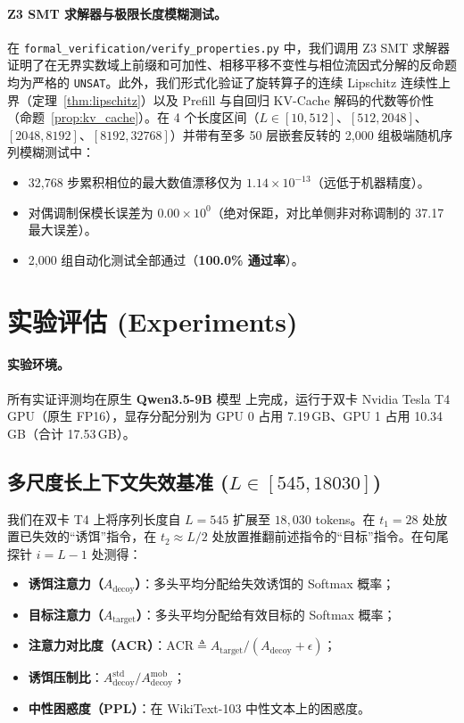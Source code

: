 \documentclass[11pt,a4paper]{article}
\theoremstyle{definition}
\begin{document}
\paragraph{Z3 SMT 求解器与极限长度模糊测试。}
在 \texttt{formal\_verification/verify\_properties.py} 中，我们调用 Z3 SMT 求解器 \cite{de2008z3} 证明了在无界实数域上前缀和可加性、相移平移不变性与相位流因式分解的反命题均为严格的 \texttt{UNSAT}。此外，我们形式化验证了旋转算子的连续 Lipschitz 连续性上界（定理~\ref{thm:lipschitz}）以及 Prefill 与自回归 KV-Cache 解码的代数等价性（命题~\ref{prop:kv_cache}）。在 4 个长度区间（$L \in [10, 512]$、$[512, 2048]$、$ [2048, 8192]$、$[8192, 32768]$）并带有至多 50 层嵌套反转的 2,000 组极端随机序列模糊测试中：
\begin{itemize}
    \item 32,768 步累积相位的最大数值漂移仅为 $1.14 \times 10^{-13}$（远低于机器精度）。
    \item 对偶调制保模长误差为 $0.00 \times 10^0$（绝对保距，对比单侧非对称调制的 37.17 最大误差）。
    \item 2,000 组自动化测试全部通过（\textbf{100.0\% 通过率}）。
\end{itemize}

\section{实验评估 (Experiments)}
\paragraph{实验环境。}
所有实证评测均在原生 \textbf{Qwen3.5-9B} 模型 \cite{qwen35} 上完成，运行于双卡 Nvidia Tesla T4 GPU（原生 FP16），显存分配分别为 GPU 0 占用 7.19\,GB、GPU 1 占用 10.34\,GB（合计 17.53\,GB）。

\subsection{多尺度长上下文失效基准 ($L \in [545, 18030]$)}
我们在双卡 T4 上将序列长度自 $L=545$ 扩展至 $18,030$ tokens。在 $t_1 = 28$ 处放置已失效的“诱饵”指令，在 $t_2 \approx L/2$ 处放置推翻前述指令的“目标”指令。在句尾探针 $i = L-1$ 处测得：
\begin{itemize}
    \item \textbf{诱饵注意力（$A_{\mathrm{decoy}}$）}：多头平均分配给失效诱饵的 Softmax 概率；
    \item \textbf{目标注意力（$A_{\mathrm{target}}$）}：多头平均分配给有效目标的 Softmax 概率；
    \item \textbf{注意力对比度（ACR）}：$\mathrm{ACR} \triangleq A_{\mathrm{target}} / (A_{\mathrm{decoy}} + \epsilon)$；
    \item \textbf{诱饵压制比}：$A_{\mathrm{decoy}}^{\mathrm{std}} / A_{\mathrm{decoy}}^{\mathrm{mob}}$；
    \item \textbf{中性困惑度（PPL）}：在 WikiText-103 中性文本上的困惑度。
\end{itemize}
\end{document}
